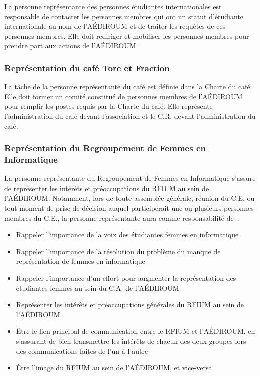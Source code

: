 \documentclass{aediroum}
\begin{document}
La personne représentante des personnes étudiantes internationales est responsable de contacter les personnes membres qui ont un statut d'étudiante internationale au nom de l'AÉDIROUM et de traiter les requêtes de ces personnes membres. Elle doit rediriger et mobiliser les personnes membres pour prendre part aux actions de l'AÉDIROUM.

\subsubsection{Représentation du café Tore et Fraction}\label{sec:representant-du-cafe-etudiant-math-info}

La tâche de la personne représentante du café est définie dans la Charte du café. Elle doit former un comité constitué de personnes membres de l'AÉDIROUM pour remplir les postes requis par la Charte du café. Elle représente l'administration du café devant l'association et le C.R. devant l'administration du café.

\subsubsection{Représentation du Regroupement de Femmes en Informatique}\label{sec:representant-e-regroupement-de-femmes-en-informatique}

La personne représentante du Regroupement de Femmes en Informatique s’assure de représenter les intérêts et préoccupations du RFIUM au sein de l’AÉDIROUM. Notamment, lors de toute assemblée générale, réunion du C.E. ou tout moment de prise de décision auquel participerait une ou plusieurs personnes membres du C.E., la personne représentante aura comme responsabilité de~:
\begin{itemize}
    \item Rappeler l'importance de la voix des étudiantes femmes en informatique
    \item Rappeler l'importance de la résolution du problème du manque de représentation de femmes en informatique
    \item Rappeler l'importance d'un effort pour augmenter la représentation des étudiantes femmes au sein du C.A. de l'AÉDIROUM
    \item Représenter les intérêts et préoccupations générales du RFIUM au sein de l'AÉDIROUM
    \item Être le lien principal de communication entre le RFIUM et l'AÉDIROUM, en s'assurant de bien transmettre les intérêts de chacun des deux groupes lors des communications faites de l'un à l'autre
    \item Être l'image du RFIUM au sein de l'AÉDIROUM, et vice-versa
\end{itemize}
\end{document}
